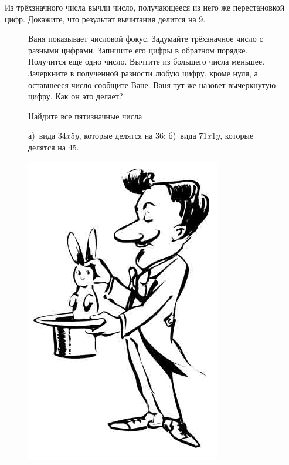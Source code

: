 \begin{thm}
    Из трёхзначного числа вычли число, получающееся из него же перестановкой цифр. Докажите, что результат вычитания делится на 9.
\end{thm}

\setlength{\intextsep}{0pt}
\begin{figure}[h]
\begin{minipage}[h]{0.84\linewidth}\setlength{\parindent}{1.5em}
    \begin{thm}
         Ваня показывает числовой фокус. Задумайте трёхзначное число с разными цифрами. Запишите его цифры в обратном порядке. Получится ещё одно число. Вычтите из большего числа меньшее. Зачеркните в полученной разности любую цифру, кроме нуля, а оставшееся число сообщите Ване. Ваня тут же назовет вычеркнутую цифру. Как он это делает? 
    \end{thm}
    
    \begin{thm}
        Найдите все пятизначные числа 
        \par
        а)~вида $\overline{34x5y}$, которые делятся на 36; б)~вида $\overline{71x1y}$, которые делятся на 45. 
    \end{thm}
\end{minipage}
\begin{minipage}[h]{0.15\linewidth}
    \includegraphics[width=0.9\columnwidth]{./img/fokusnik}
\end{minipage}
\end{figure}
\setlength{\intextsep}{12pt}

